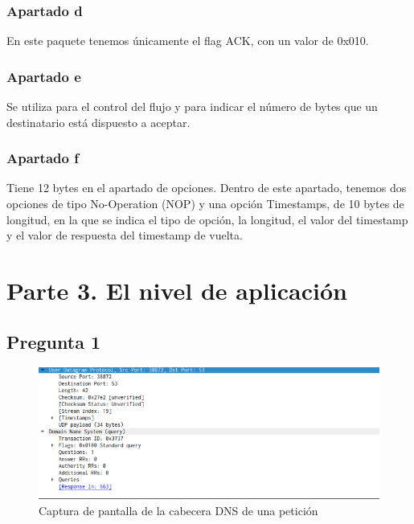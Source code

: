 \documentclass[spanish]{report} %
\begin{document}
\subsubsection{Apartado d}
En este paquete tenemos únicamente el flag ACK, con un valor de 0x010.

\subsubsection{Apartado e}
Se utiliza para el control del flujo y para indicar el número de bytes que un
destinatario está dispuesto a aceptar.

\subsubsection{Apartado f}
Tiene 12 bytes en el apartado de opciones. Dentro de este apartado, tenemos dos
opciones de tipo No-Operation (NOP) y una opción Timestamps, de 10 bytes de
longitud, en la que se indica el tipo de opción, la longitud, el valor del
timestamp y el valor de respuesta del timestamp de vuelta.


\newpage
\section{Parte 3. El nivel de aplicación}

\subsection{Pregunta 1}

\begin{figure}[h]
\begin{center}
\includegraphics[scale=.5]{../img/7.png}
\end{center}
\caption{Captura de pantalla de la cabecera DNS de una petición}
\end{figure}
\end{document}
